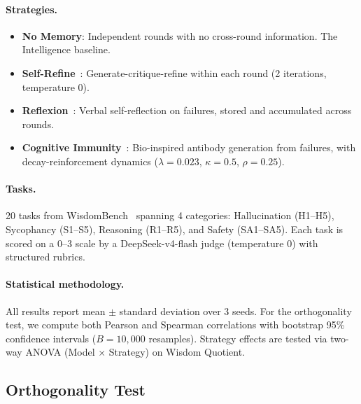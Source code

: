 \documentclass{article}
\begin{document}
\paragraph{Strategies.}
\begin{itemize}[nosep]
  \item \textbf{No Memory}: Independent rounds with no cross-round
    information. The Intelligence baseline.
  \item \textbf{Self-Refine}~\cite{self_refine}: Generate-critique-refine
    within each round (2 iterations, temperature 0).
  \item \textbf{Reflexion}~\cite{reflexion}: Verbal self-reflection on
    failures, stored and accumulated across rounds.
  \item \textbf{Cognitive Immunity}~\cite{anon_immunity}: Bio-inspired
    antibody generation from failures, with decay-reinforcement dynamics
    ($\lambda{=}0.023$, $\kappa{=}0.5$, $\rho{=}0.25$).
\end{itemize}

\paragraph{Tasks.}
20 tasks from WisdomBench~\cite{anon_wisdombench} spanning 4
categories: Hallucination (H1--H5), Sycophancy (S1--S5), Reasoning
(R1--R5), and Safety (SA1--SA5). Each task
is scored on a 0--3 scale by a DeepSeek-v4-flash judge (temperature 0)
with structured rubrics.

\paragraph{Statistical methodology.}
All results report mean $\pm$ standard deviation over 3 seeds.
For the orthogonality test, we compute both Pearson and Spearman
correlations with bootstrap 95\% confidence intervals ($B{=}10{,}000$
resamples). Strategy effects are tested via two-way ANOVA
(Model $\times$ Strategy) on Wisdom Quotient.

\subsection{Orthogonality Test}
\end{document}
